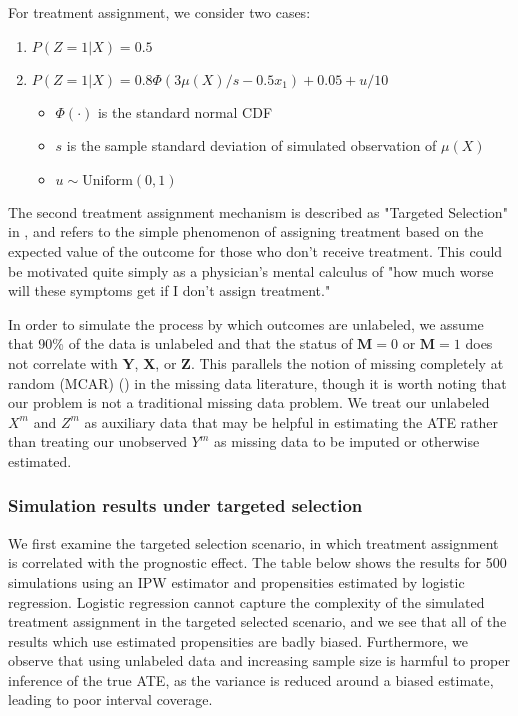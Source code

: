 \documentclass[aos]{imsart}
\newcommand{\X}{\mathbf{X}}
\newcommand{\M}{\mathbf{M}}
\newcommand{\Y}{\mathbf{Y}}
\newcommand{\Z}{\mathbf{Z}}
\begin{document}
For treatment assignment, we consider two cases:

\begin{enumerate}
\item $P(Z = 1 | X) = 0.5$
\item $P(Z = 1 | X) = 0.8\Phi(3 \mu(X) / s - 0.5 x_1) + 0.05 + u / 10$
\begin{itemize}
	\item $\Phi(\cdot)$ is the standard normal CDF
	\item $s$ is the sample standard deviation of simulated observation of $\mu(X)$
	\item $u \sim \mathrm{Uniform}(0, 1)$ 
\end{itemize}
\end{enumerate}

The second treatment assignment mechanism is described as "Targeted Selection" in \cite{hahn2017bayesian}, and 
refers to the simple phenomenon of assigning treatment based on the expected value of the outcome for those who don't receive 
treatment. This could be motivated quite simply as a physician's mental calculus of "how much worse will these symptoms get if I don't 
assign treatment."

In order to simulate the process by which outcomes are unlabeled, we assume that 90\% of the data is unlabeled and that the status of $\M = 0$ or $\M = 1$
does not correlate with $\Y$, $\X$, or $\Z$. This parallels the notion of missing completely at random (MCAR) (\cite{little2019statistical}) in the missing data 
literature, though it is worth noting that our problem is not a traditional missing data problem. We treat our unlabeled $X^m$ and $Z^m$ as auxiliary data that 
may be helpful in estimating the ATE rather than treating our unobserved $Y^m$ as missing data to be imputed or otherwise estimated.

\subsubsection{Simulation results under targeted selection}

We first examine the targeted selection scenario, in which treatment assignment is correlated with the 
prognostic effect. The table below shows the results for 500 simulations using an IPW estimator and propensities 
estimated by logistic regression. Logistic regression cannot capture the complexity of the simulated 
treatment assignment in the targeted selected scenario, and we see that all of the results 
which use estimated propensities are badly biased. Furthermore, we observe that using unlabeled data 
and increasing sample size is harmful to proper inference of the true ATE, as the variance is reduced 
around a biased estimate, leading to poor interval coverage.
\end{document}
